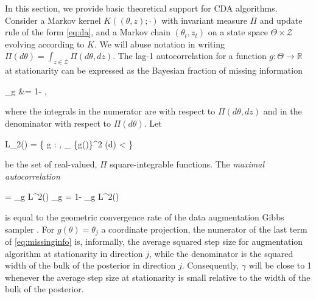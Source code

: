 \documentclass[10pt]{article}
\newcommand{\be}{\begin{equs}}
\newcommand{\ee}{\end{equs}}
\newcommand{\bb}[1]{\mathbb{#1}}
\newcommand{\mc}[1]{\mathcal{#1}}
\DeclareMathOperator{\var}{var}
\begin{document}
In this section, we provide basic theoretical support for CDA algorithms. Consider a Markov kernel $K((\theta,z);\cdot)$ with invariant measure $\Pi$ and update rule of the form \eqref{eq:da}, and a Markov chain $(\theta_t,z_t)$ on a state space $\Theta \times \mc Z$ evolving according to $K$. We will abuse notation in writing $\Pi(d\theta) = \int_{z \in \mc Z} \Pi(d\theta,dz)$. The lag-1 autocorrelation for a function $g : \Theta \to \bb R$ at stationarity can be expressed as the Bayesian fraction of missing information \citep{papaspiliopoulos2007general}
\be
\gamma_g &= 1- \frac{\bb E[\var(g(\theta) \mid z)]}{\var(g(\theta))}, \label{eq:missinginfo}
\ee
where the integrals in the numerator are with respect to $\Pi(d\theta,dz)$ and in the denominator with respect to $\Pi(d\theta)$. Let 
\be
L_2(\Pi) = \left\{ g : \Theta \to \bb R, \int_{\theta \in \Theta} \{g(\theta)\}^2 \Pi(d\theta) < \infty \right\} 
\ee
be the set of real-valued, $\Pi$ square-integrable functions. The \emph{maximal autocorrelation}
\be
\gamma = \sup_{g \in L^2(\Pi)} \gamma_g = 1- \inf_{g \in L^2(\Pi)} \frac{\bb E[\var(g(\theta) \mid z)]}{\var(g(\theta))}
\ee
is equal to the geometric convergence rate of the data augmentation Gibbs sampler \citep{liu2008monte}. For $g(\theta) = \theta_j$ a coordinate projection, the numerator of the last term of \eqref{eq:missinginfo} is, informally, the average squared step size for augmentation algorithm at stationarity in direction $j$, while the denominator is the squared width of the bulk of the posterior in direction $j$. Consequently, $\gamma$ will be close to 1 whenever the average step size at stationarity is small relative to the width of the bulk of the posterior. 
\end{document}
